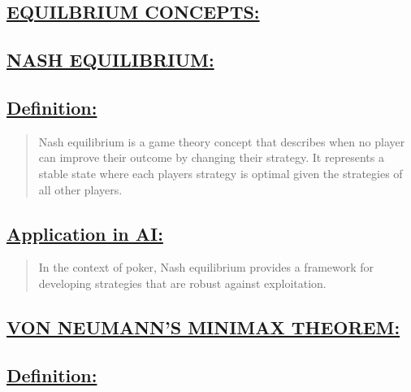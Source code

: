 \documentclass[
]{article}
\begin{document}
\subsection*{\texorpdfstring{\textbf{\ul{EQUILBRIUM
CONCEPTS:}}}{EQUILBRIUM CONCEPTS:}}\label{equilbrium-concepts}

\subsection*{\texorpdfstring{\textbf{\ul{NASH
EQUILIBRIUM:}}}{NASH EQUILIBRIUM:}}\label{nash-equilibrium}

\subsection*{\texorpdfstring{\textbf{\ul{Definition:}}
}{Definition: }}\label{definition}

\begin{quote}
Nash equilibrium is a game theory concept that describes when no player
can improve their outcome by changing their strategy. It represents a
stable state where each player\textquotesingle s strategy is optimal
given the strategies of all other players.
\end{quote}

\subsection*{\texorpdfstring{\textbf{\ul{Application in
AI:}}}{Application in AI:}}\label{application-in-ai}

\begin{quote}
In the context of poker, Nash equilibrium provides a framework for
developing strategies that are robust against exploitation.
\end{quote}

\subsection*{\texorpdfstring{\textbf{\ul{VON NEUMANN'S MINIMAX
THEOREM:}}}{VON NEUMANN'S MINIMAX THEOREM:}}\label{von-neumanns-minimax-theorem}

\subsection*{\texorpdfstring{\textbf{\ul{Definition:}}
}{Definition: }}\label{definition-1}
\end{document}
